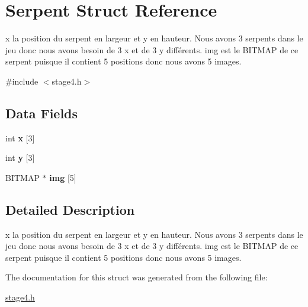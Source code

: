 \hypertarget{struct_serpent}{\section{Serpent Struct Reference}
\label{struct_serpent}
}


x la position du serpent en largeur et y en hauteur. Nous avons 3 serpents dans le jeu donc nous avons besoin de 3 x et de 3 y différents. img est le B\-I\-T\-M\-A\-P de ce serpent puisque il contient 5 positions donc nous avons 5 images.  




{\ttfamily \#include $<$stage4.\-h$>$}

\subsection*{Data Fields}
\begin{DoxyCompactItemize}
\item 
\hypertarget{struct_serpent_a768191482a4f7f373f8449cb24a11c4b}{int {\bfseries x} \mbox{[}3\mbox{]}}\label{struct_serpent_a768191482a4f7f373f8449cb24a11c4b}

\item 
\hypertarget{struct_serpent_a33f58bd49edc8ddeef65843091bbfe16}{int {\bfseries y} \mbox{[}3\mbox{]}}\label{struct_serpent_a33f58bd49edc8ddeef65843091bbfe16}

\item 
\hypertarget{struct_serpent_a4206cc246eae0a153dd37253a8835ac9}{B\-I\-T\-M\-A\-P $\ast$ {\bfseries img} \mbox{[}5\mbox{]}}\label{struct_serpent_a4206cc246eae0a153dd37253a8835ac9}

\end{DoxyCompactItemize}


\subsection{Detailed Description}
x la position du serpent en largeur et y en hauteur. Nous avons 3 serpents dans le jeu donc nous avons besoin de 3 x et de 3 y différents. img est le B\-I\-T\-M\-A\-P de ce serpent puisque il contient 5 positions donc nous avons 5 images. 


\begin{DoxyItemize}
\item 
\end{DoxyItemize}

The documentation for this struct was generated from the following file\-:\begin{DoxyCompactItemize}
\item 
\hyperlink{stage4_8h}{stage4.\-h}\end{DoxyCompactItemize}
